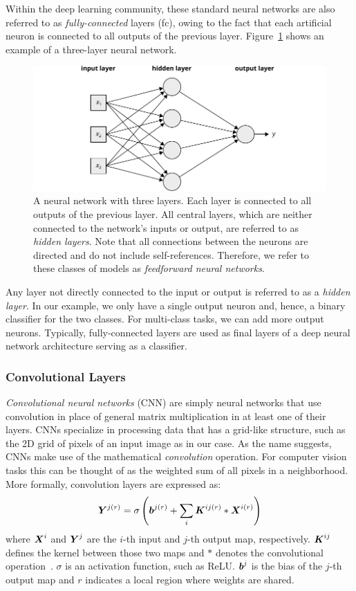 Within the deep learning community, these standard neural networks are also referred to as \emph{fully-connected} layers (\ac{fc}), owing to the fact that each artificial neuron is connected to all outputs of the previous layer. Figure~\ref{fig:nn} shows an example of a three-layer neural network.
%
	\begin{figure}[tp]
  		\centering
    	\includegraphics{img/nn.pdf}
    	\caption{A neural network with three layers. Each layer is connected to all outputs of the previous layer. All central layers, which are neither connected to the network's inputs or output, are referred to as \emph{hidden layers}. Note that all connections between the neurons are directed and do not include self-references. Therefore, we refer to these classes of models as \emph{feedforward neural networks}.}
    	\label{fig:nn}
	\end{figure}
%
Any layer not directly connected to the input or output is referred to as a \emph{hidden layer}. In our example, we only have a single output neuron and, hence, a binary classifier for the two classes. For multi-class tasks, we can add more output neurons. Typically, fully-connected layers are used as final layers of a deep neural network architecture serving as a classifier.

\subsubsection{Convolutional Layers}
\emph{Convolutional neural networks} (CNN) are simply neural networks that use convolution in place of general matrix multiplication in at least one of their layers. CNNs specialize in processing data that has a grid-like structure, such as the 2D grid of pixels of an input image as in our case. As the name suggests, CNNs make use of the mathematical \emph{convolution} operation. For computer vision tasks this can be thought of as the weighted sum of all pixels in a neighborhood. More formally, convolution layers are expressed as:
%
$$
\boldsymbol{Y}^{j(r)} = \sigma \left( \boldsymbol{b}^{j(r)} + \sum_i \boldsymbol{K}^{ij(r)} \ast \boldsymbol{X}^{i(r)} \right)
$$
%
where $\boldsymbol{X}^i$ and $\boldsymbol{Y}^j$ are the $i$-th input and $j$-th output map, respectively. $\boldsymbol{K}^{ij}$ defines the kernel between those two maps and $\ast$ denotes the convolutional operation~\cite{sun2014deep}. $\sigma$ is an activation function, such as ReLU. $\boldsymbol{b}^j$ is the bias of the $j$-th output map and $r$ indicates a local region where weights are shared.

